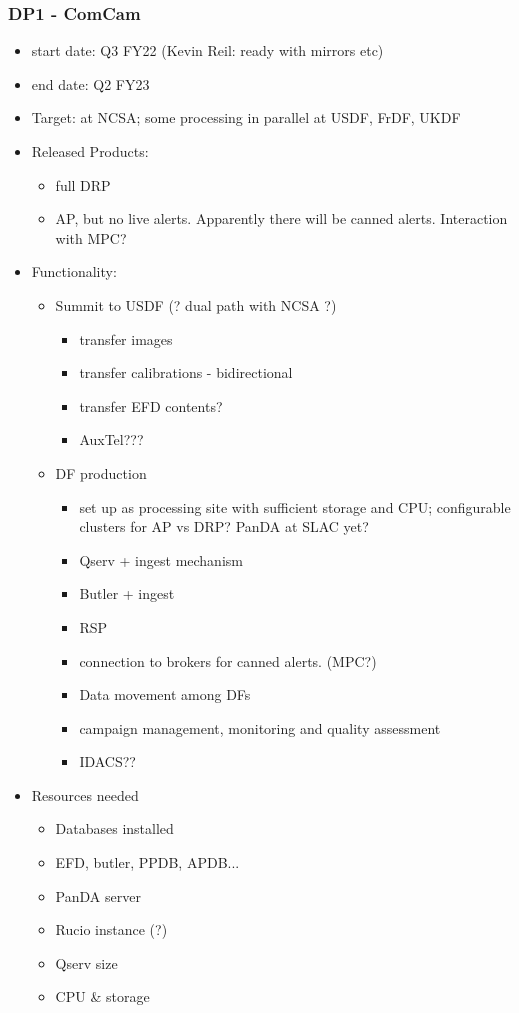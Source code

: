 \subsubsection{ DP1 - ComCam}
\begin{itemize}
\item start date: Q3 FY22 (Kevin Reil: ready with mirrors etc)
\item end date: Q2 FY23
\item Target: at NCSA; some processing in parallel at USDF, FrDF, UKDF
\item Released Products:
\begin{itemize}
\item full DRP
\item AP, but no live alerts. Apparently there will be canned alerts. Interaction with MPC?
\end{itemize}
\item Functionality:
\begin{itemize}
\item Summit to USDF (? dual path with NCSA ?)
\begin{itemize}
\item transfer images
\item transfer calibrations - bidirectional
\item transfer EFD contents?
\item AuxTel???
\end{itemize}
\item DF production
\begin{itemize}
\item set up as processing site with sufficient storage and CPU; configurable clusters for AP vs DRP? PanDA at SLAC yet?
\item Qserv + ingest mechanism
\item Butler + ingest
\item RSP
\item connection to brokers for canned alerts. (MPC?)
\item Data movement among DFs
\item campaign management, monitoring and quality assessment
\item IDACS??
\end{itemize}
\end{itemize}
\item Resources needed
\begin{itemize}
\item Databases installed
\item EFD, butler, PPDB, APDB...
\item PanDA server
\item Rucio instance (?)
\item Qserv size
\item CPU \& storage
\end{itemize}
\end{itemize}
